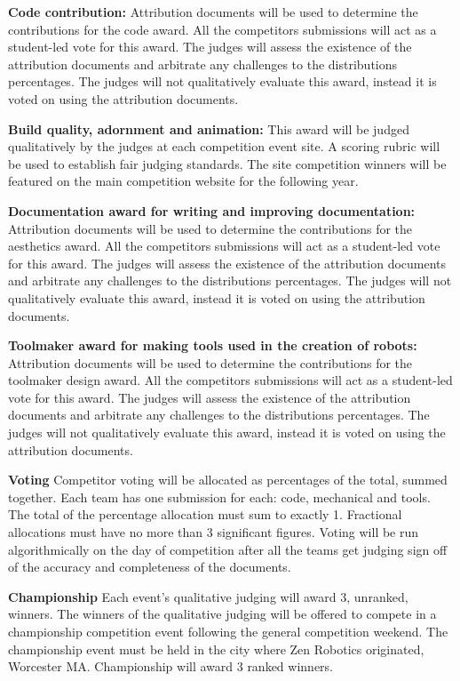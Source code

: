 \documentclass{article}
\begin{document}
\textbf{Code contribution:} Attribution documents will be used to determine the contributions for the code award. All the competitors submissions will act as a student-led vote for this award. The judges will assess the existence of the  attribution documents and arbitrate any challenges to the distributions percentages. The judges will not qualitatively evaluate this award, instead it is voted on using the attribution documents. 
 	
\textbf{Build quality, adornment and animation:} This award will be judged qualitatively by the judges at each competition event site. A scoring rubric will be used to establish fair judging standards. The site competition winners will be featured on the main competition website for the following year. 
 	
\textbf{Documentation award for writing and improving documentation:} Attribution documents will be used to determine the contributions for the aesthetics award. All the competitors submissions will act as a student-led vote for this award. The judges will assess the existence of the  attribution documents and arbitrate any challenges to the distributions percentages. The judges will not qualitatively evaluate this award, instead it is voted on using the attribution documents. 
 	
\textbf{Toolmaker award for making tools used in the creation of robots:} Attribution documents will be used to determine the contributions for the toolmaker design award. All the competitors submissions will act as a student-led vote for this award. The judges will assess the existence of the  attribution documents and arbitrate any challenges to the distributions percentages. The judges will not qualitatively evaluate this award, instead it is voted on using the attribution documents. 

\textbf{Voting} Competitor voting will be allocated as percentages of the total, summed together. Each team has one submission for each: code, mechanical and tools. The total of the percentage allocation must sum to exactly 1. Fractional allocations must have no more than 3 significant figures. Voting will be run algorithmically on the day of competition after all the teams get judging sign off of the accuracy and completeness of the documents. 

 	
\textbf{Championship} Each event's qualitative judging will award 3, unranked, winners. The winners of the qualitative judging will be offered to compete in a championship competition event following the general competition weekend. The championship event must be held in the city where Zen Robotics originated, Worcester MA. Championship will award 3 ranked winners. 



\vspace{1cm}
 
 
\end{document}
